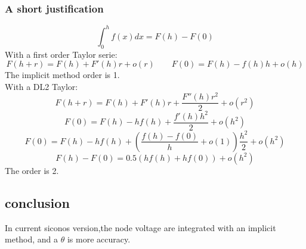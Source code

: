 \subsubsection{A short justification}
\[\int_{0}^{h}{f(x)}dx = F(h)-F(0)\]
With a first order Taylor serie:
\[F(h+r)=F(h)+F'(h)r+o(r) \qquad F(0)=F(h)-f(h)h+o(h)\]
The implicit method order is 1.\\
With a DL2 Taylor:
\[F(h+r)=F(h)+F'(h)r+\frac{F''(h)r^2}{2}+o(r^2)\]
\[F(0)=F(h)-hf(h)+\frac{f'(h)h^2}{2}+o(h^2) \]
\[F(0)=F(h)-hf(h)+ (\frac{f(h)-f(0)}{h}+o(1)) \frac{h^2}{2}+o(h^2)\]
\[F(h)-F(0)=0.5(hf(h)+hf(0))+o(h^2)\]
The order is 2. 

\subsection{conclusion}
In current siconos version,the node voltage are integrated with an implicit method, and a $\theta$
is more accuracy.
